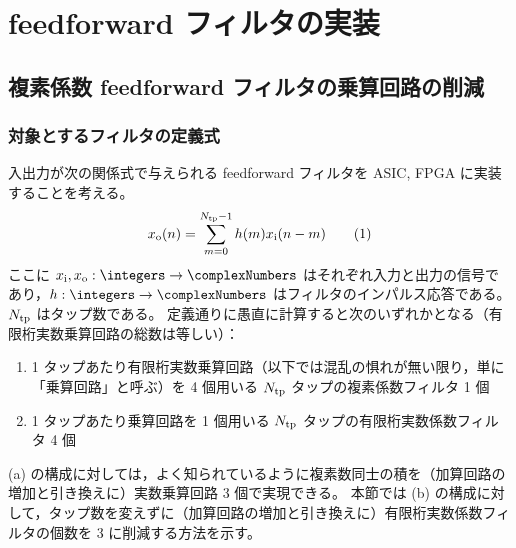 \section{feedforward フィルタの実装}
    \subsection{複素係数 feedforward フィルタの乗算回路の削減}
        \subsubsection{対象とするフィルタの定義式}
            \newcommand*{\xIn}{x_\text{i}}
            \newcommand*{\xOut}{x_\text{o}}
            入出力が次の関係式で与えられる feedforward フィルタを ASIC, FPGA に実装することを考える。
            \[ \xOut(n) = \sum_{m=0}^{\Ntp-1} h(m)\xIn(n-m) \tag{1} \]
            ここに $\xIn,\xOut:\integers\to\complexNumbers$ はそれぞれ入力と出力の信号であり，$h:\integers\to\complexNumbers$ はフィルタのインパルス応答である。$N_{\text{tp}}$ はタップ数である。
            定義通りに愚直に計算すると次のいずれかとなる（有限桁実数乗算回路の総数は等しい）：
            \begin{enumerate}[label=(\alph*)]
                \item 1 タップあたり有限桁実数乗算回路（以下では混乱の惧れが無い限り，単に「乗算回路」と呼ぶ）を 4 個用いる $N_{\text{tp}}$ タップの複素係数フィルタ 1 個
                \item 1 タップあたり乗算回路を 1 個用いる $N_{\text{tp}}$ タップの有限桁実数係数フィルタ 4 個
            \end{enumerate}
            (a) の構成に対しては，よく知られているように複素数同士の積を（加算回路の増加と引き換えに）実数乗算回路 3 個で実現できる。
            本節では (b) の構成に対して，タップ数を変えずに（加算回路の増加と引き換えに）有限桁実数係数フィルタの個数を 3 に削減する方法を示す。
